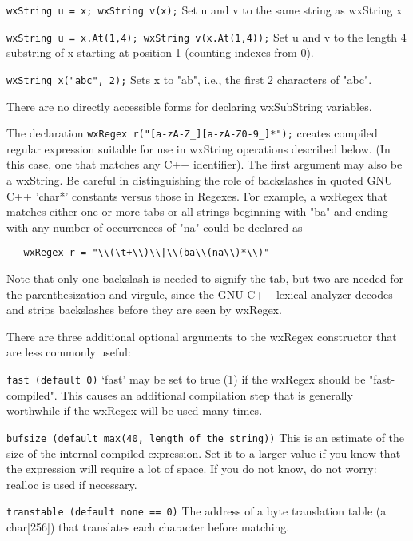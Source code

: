 {\tt wxString u = x; wxString v(x);} 
Set u and v to the same string as wxString x

{\tt wxString u = x.At(1,4); wxString v(x.At(1,4));} 
Set u and v to the length 4 substring of x starting at position 1
(counting indexes from 0).

{\tt wxString x("abc", 2);} 
Sets x to "ab", i.e., the first 2 characters of "abc".

There are no directly accessible forms for declaring wxSubString
variables.

The declaration {\tt wxRegex r("[a-zA-Z_][a-zA-Z0-9_]*");} creates
compiled regular expression suitable for use in wxString operations
described below. (In this case, one that matches any C++ identifier).
The first argument may also be a wxString.  Be careful in distinguishing
the role of backslashes in quoted GNU C++ 'char*' constants versus those
in Regexes. For example, a wxRegex that matches either one or more tabs
or all strings beginning with "ba" and ending with any number of
occurrences of "na" could be declared as 
\begin{verbatim} 
   wxRegex r = "\\(\t+\\)\\|\\(ba\\(na\\)*\\)"
\end{verbatim}
Note that only one backslash is needed
to signify the tab, but two are needed for the parenthesization and
virgule, since the GNU C++ lexical analyzer decodes and strips
backslashes before they are seen by wxRegex.

There are three additional optional arguments to the wxRegex
constructor that are less commonly useful:

{\tt fast (default 0)} 
`fast' may be set to true (1) if the wxRegex should be
"fast-compiled". This causes an additional compilation step that
is generally worthwhile if the wxRegex will be used many times.

{\tt bufsize (default max(40, length of the string))} 
This is an estimate of the size of the internal compiled
expression. Set it to a larger value if you know that the
expression will require a lot of space. If you do not know, do not
worry: realloc is used if necessary.

{\tt transtable (default none == 0)} 
The address of a byte translation table (a char[256]) that
translates each character before matching.

